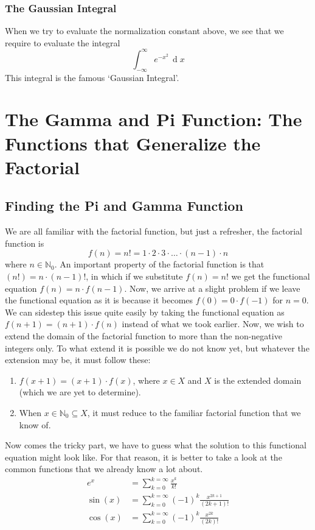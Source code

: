 \subsubsection{The Gaussian Integral}
When we try to evaluate the normalization constant above, we see that we require to evaluate the integral $$\int_{-\infty}^{\infty}e^{-x^2}\,\operatorname{d}x$$ This integral is the famous `Gaussian Integral'.
\section{The Gamma and Pi Function: The Functions that Generalize the Factorial}
\subsection{Finding the Pi and Gamma Function}
We are all familiar with the factorial function, but just a refresher, the factorial function is $$f(n)=n!=1\cdot2\cdot3\cdot\dots\cdot(n-1)\cdot n$$ where $n\in\mathbb{N}_0$. An important property of the factorial function is that $(n!)=n\cdot(n-1)!$, in which if we substitute $f(n)=n!$ we get the functional equation $f(n)=n\cdot f(n-1)$. Now, we arrive at a slight problem if we leave the functional equation as it is because it becomes $f(0)=0\cdot f(-1)$ for $n=0$. We can sidestep this issue quite easily by taking the functional equation as $f(n+1)=(n+1)\cdot f(n)$ instead of what we took earlier. Now, we wish to extend the domain of the factorial function to more than the non-negative integers only. To what extend it is possible we do not know yet, but whatever the extension may be, it must follow these:
\begin{enumerate}
	\item $f(x+1)=(x+1)\cdot f(x)$, where $x\in X$ and $X$ is the extended domain (which we are yet to determine).
	\item When $x\in\mathbb{N}_0\subseteq X$, it must reduce to the familiar factorial function that we know of.
\end{enumerate}
Now comes the tricky part, we have to guess what the solution to this functional equation might look like. For that reason, it is better to take a look at the common functions that we already know a lot about.
\begin{align*}
	 e^x&=\sum_{k=0}^{k=\infty}\frac{x^k}{k!}\\
	 \sin(x)&=\sum_{k=0}^{k=\infty}(-1)^k\frac{x^{2k+1}}{(2k+1)!}\\
	 \cos(x)&=\sum_{k=0}^{k=\infty}(-1)^k\frac{x^{2k}}{(2k)!}
\end{align*}
